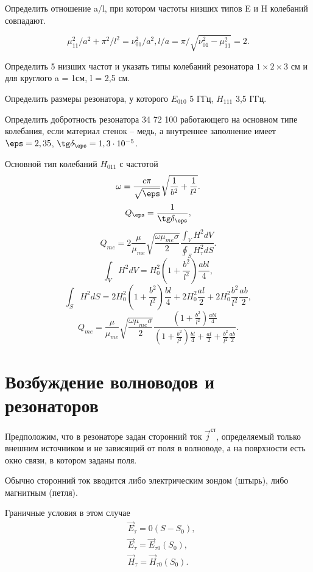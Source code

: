 \begin{problem}
	Определить отношение a/l, при котором частоты низших типов E и H колебаний совпадают.
\end{problem}

\[
	\mu_{11}^2/a^2 + \pi^2/l^2 = \nu_{01}^2/a^2, l/a = \pi/\sqrt{\nu_{01}^2 - \mu_{11}^2} = 2.
\]
\begin{problem}
Определить 5 низших частот и указать типы колебаний резонатора \(1\times2\times3\) см и для круглого a = 1см, l = 2,5 см.
\end{problem}
\begin{problem}
Определить размеры резонатора, у которого \(E_{010}\) 5 ГГц, \(H_{111}\) 3,5 ГГц.
\end{problem}
\begin{problem}
Определить добротность резонатора 34 72 100 работающего на основном типе колебания, если материал стенок -- медь, а внутреннее заполнение имеет \(\eps = 2,35\), \(\tg\delta_\eps = 1,3\cdot10^{-5}\).
\end{problem}

Основной тип колебаний \( H_{011} \) с частотой
\[
	\omega = \frac{c\pi}{\sqrt{\eps}}\sqrt{\frac{1}{b^2} + \frac{1}{l^2}}.
\]
\[
	Q_\eps = \frac{1}{\tg\delta_\eps},
\]
\[
	Q_{me} = 2\frac{\mu}{\mu_{me}}\sqrt{\frac{\omega\mu_{me}\sigma}{2}}
	\frac{\int_V H^2 dV}{\oint_S H_\tau^2 dS}.
\]
\[
	\int_V H^2 dV = H_0^2\left( 1 + \frac{b^2}{l^2} \right)\frac{abl}{4},
\]
\[
	\int_S H^2 dS = 2H_0^2\left( 1 + \frac{b^2}{l^2} \right)\frac{bl}{4} +
	2H_0^2\frac{al}{2} + 2H_0^2\frac{b^2}{l^2}\frac{ab}{2},
\]
\[
	Q_{me} = \frac{\mu}{\mu_{me}}\sqrt{\frac{\omega\mu_{me}\sigma}{2}}
	\frac{\left( 1 + \frac{b^2}{l^2} \right)\frac{abl}{4}}{\left( 1 + \frac{b^2}{l^2} \right)\frac{bl}{4} + \frac{al}{2} + \frac{b^2}{l^2}\frac{ab}{2}}.
\]

\chapter{Возбуждение волноводов и резонаторов}
Предположим, что в резонаторе задан сторонний ток \( \vec{j}^\text{ст} \), определяемый только внешним источником и не зависящий от поля в волноводе, а на поврхности есть окно связи, в котором заданы поля.

Обычно сторонний ток вводится либо электрическим зондом (штырь), либо магнитным (петля).

Граничные условия в этом случае
\begin{align*}
	& \vec{E}_\tau = 0 (S - S_0),\\
	& \vec{E}_\tau = \vec{E}_{\tau0} (S_0),\\
	& \vec{H}_\tau = \vec{H}_{\tau0} (S_0).\\
\end{align*}

